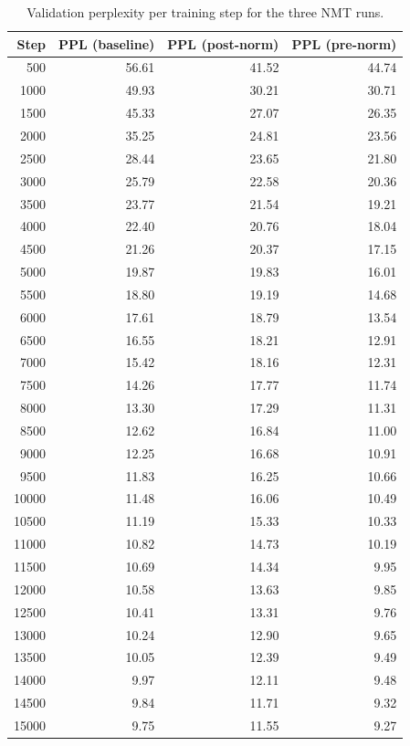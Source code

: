 \begin{table}[htbp]
  \centering
  \caption{Validation perplexity per training step for the three NMT runs.}
  \label{tab:validation-ppl}
  \begin{tabular}{rrrr}
    \toprule
    Step & PPL (baseline) & PPL (post-norm) & PPL (pre-norm) \\
    \midrule
    500 & 56.61 & 41.52 & 44.74 \\
    1000 & 49.93 & 30.21 & 30.71 \\
    1500 & 45.33 & 27.07 & 26.35 \\
    2000 & 35.25 & 24.81 & 23.56 \\
    2500 & 28.44 & 23.65 & 21.80 \\
    3000 & 25.79 & 22.58 & 20.36 \\
    3500 & 23.77 & 21.54 & 19.21 \\
    4000 & 22.40 & 20.76 & 18.04 \\
    4500 & 21.26 & 20.37 & 17.15 \\
    5000 & 19.87 & 19.83 & 16.01 \\
    5500 & 18.80 & 19.19 & 14.68 \\
    6000 & 17.61 & 18.79 & 13.54 \\
    6500 & 16.55 & 18.21 & 12.91 \\
    7000 & 15.42 & 18.16 & 12.31 \\
    7500 & 14.26 & 17.77 & 11.74 \\
    8000 & 13.30 & 17.29 & 11.31 \\
    8500 & 12.62 & 16.84 & 11.00 \\
    9000 & 12.25 & 16.68 & 10.91 \\
    9500 & 11.83 & 16.25 & 10.66 \\
    10000 & 11.48 & 16.06 & 10.49 \\
    10500 & 11.19 & 15.33 & 10.33 \\
    11000 & 10.82 & 14.73 & 10.19 \\
    11500 & 10.69 & 14.34 & 9.95 \\
    12000 & 10.58 & 13.63 & 9.85 \\
    12500 & 10.41 & 13.31 & 9.76 \\
    13000 & 10.24 & 12.90 & 9.65 \\
    13500 & 10.05 & 12.39 & 9.49 \\
    14000 & 9.97 & 12.11 & 9.48 \\
    14500 & 9.84 & 11.71 & 9.32 \\
    15000 & 9.75 & 11.55 & 9.27 \\

\end{tabular}
\end{table}
